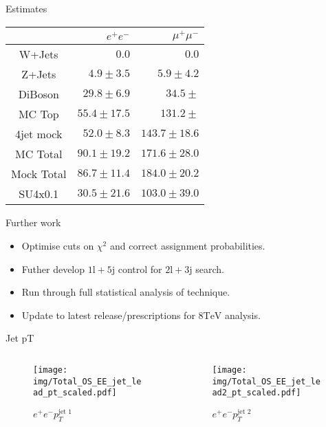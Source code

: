 \documentclass{beamer}
\begin{document}
\begin{frame}{Estimates}
\begin{table}
\centering
\begin{tabular}{c||r|r}
                     & $e^+e^- $ & $\mu^+\mu^-$ \\
\hline \hline
W+Jets    & $0.0$         & $0.0$ \\
Z+Jets    & $4.9\pm3.5$   & $5.9\pm4.2$ \\
DiBoson   & $29.8\pm6.9$  & $34.5\pm$ \\
MC Top    & $55.4\pm17.5$ & $131.2\pm$ \\
4jet mock & $52.0\pm8.3$  & $143.7\pm18.6$ \\
\hline
MC Total  & $90.1\pm19.2$ & $171.6\pm28.0$ \\
Mock Total& $86.7\pm11.4$ & $184.0\pm20.2$ \\
\hline
SU4x0.1   & $30.5\pm21.6$ & $103.0\pm39.0$ \\
\hline
\end{tabular}
\label{tab:myfirsttable}
\end{table}
\end{frame}

\begin{frame}{Further work}
  \begin{itemize}
    \item Optimise cuts on $\chi^2$ and correct assignment probabilities.
    \item Futher develop $1\text{l}+5\text{j}$ control for $2\text{l}+3\text{j}$ search.
    \item Run through full statistical analysis of technique.
    \item Update to latest release/prescriptions for $8\text{TeV}$ analysis.
  \end{itemize}
\end{frame}


\begin{frame}{Jet pT}
  \begin{columns}
    \begin{column}{0.45\textwidth}\begin{figure}
      \caption{$e^{+}e^{-}$$p_{T}^{\text{jet 1}}$}
      \texttt{[image: img/Total\_OS\_EE\_jet\_lead\_pt\_scaled.pdf]}
    \end{figure}\end{column}
    \begin{column}{0.45\textwidth}\begin{figure}
      \caption{$e^{+}e^{-}$$p_{T}^{\text{jet 2}}$}
      \texttt{[image: img/Total\_OS\_EE\_jet\_lead2\_pt\_scaled.pdf]}
    \end{figure}\end{column}
  \end{columns}
\end{frame}
\end{document}
